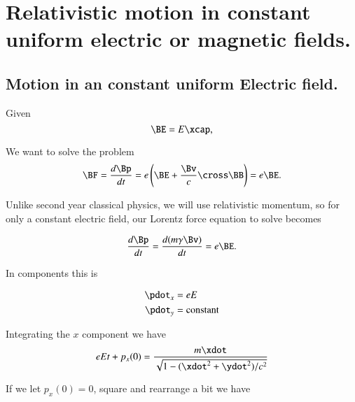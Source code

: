 %
%

\chapter{Relativistic motion in constant uniform electric or magnetic fields.}
\label{chap:relativisticElectrodynamicsT3}
{}
\date{Feb 3, 2011}

\beginArtWithToc

\section{Motion in an constant uniform Electric field.}

Given
\begin{equation}\label{eqn:relativisticElectrodynamicsT3:}
\BE = E \xcap,
\end{equation}

We want to solve the problem
\begin{equation}\label{eqn:relativisticElectrodynamicsT3:20}
\BF = \frac{d\Bp}{dt} =
e \left( \BE + \frac{\Bv}{c} \cross \BB \right) = e \BE.
\end{equation}

Unlike second year classical physics, we will use relativistic momentum, so for only a constant electric field, our Lorentz force equation to solve becomes

\begin{equation}\label{eqn:relativisticElectrodynamicsT3:40}
\frac{d\Bp}{dt} = \frac{d (m \gamma \Bv)}{dt} = e \BE.
\end{equation}

In components this is

\begin{align}\label{eqn:relativisticElectrodynamicsT3:60}
\pdot_x &= e E \\
\pdot_y &= \text{constant}
\end{align}

Integrating the $x$ component we have
\begin{equation}\label{eqn:relativisticElectrodynamicsT3:65}
e E t + p_x(0)
=
\frac{m \xdot}{\sqrt{1 - (\xdot^2 + \ydot^2)/c^2}} 
\end{equation}

If we let $p_x(0) = 0$, square and rearrange a bit we have

